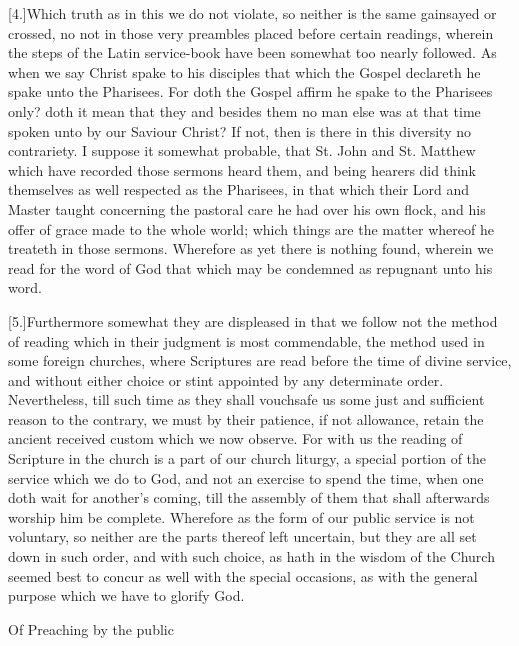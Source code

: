 [4.]Which truth as in this we do not violate, so neither is the same gainsayed or crossed, no not in those very preambles placed before certain readings, wherein the steps of the Latin service-book have been somewhat too nearly followed. As when we say Christ spake to his disciples that which the Gospel declareth he spake unto the Pharisees. For doth the Gospel affirm he spake to the Pharisees only? doth it mean that they and besides them no man else was at that time spoken unto by our Saviour Christ? If not, then is there in this diversity no contrariety. I suppose it somewhat probable, that St. John and St. Matthew which have recorded those sermons heard them, and being hearers did think themselves as well respected as the Pharisees, in that which their  Lord and Master taught concerning the pastoral care he had over his own flock,
 and his offer of grace made to the whole world; which things are the matter whereof he treateth in those sermons. Wherefore as yet there is nothing found, wherein we read for the word of God that which may be condemned as repugnant unto his word.

[5.]Furthermore somewhat they are displeased in that we follow not the method of reading which in their judgment is most commendable, the method used in some foreign churches, where Scriptures are read before the time of divine service, and without either choice or stint appointed by any determinate order. Nevertheless, till such time as they shall vouchsafe us some just and sufficient reason to the contrary, we must by their patience, if not allowance, retain the ancient received custom which we now observe. For with us the reading of Scripture in the church is a part of our church liturgy, a special portion of the service which we do to God, and not an exercise to spend the time, when one doth wait for another’s coming, till the assembly of them that shall afterwards worship him be complete. Wherefore as the form of our public service is not voluntary, so neither are the parts thereof left uncertain, but they are all set down in such order, and with such choice, as hath in the wisdom of the Church seemed best to concur as well with the special occasions, as with the general purpose which we have to glorify God.


Of Preaching by the public
